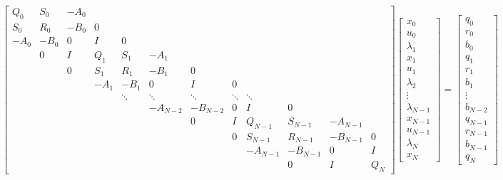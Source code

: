 \documentclass[withoutpreface,bwprint]{NoteBook}
\begin{document}
\begin{equation}
\label{eq:block_KKT_condition_sorted_by_time}
\begin{bmatrix}
Q_0 & S_0 & -A_0 &  &  & \\
S_0 & R_0 & -B_0 & 0 &  & \\
-A_0 & -B_0 & 0 & I & 0 &  \\
 & 0 & I & Q_1 & S_1 & -A_1 & \\
 &  & 0 & S_1 & R_1 & -B_1 & 0\\
 &  &  & -A_1 & -B_1 & 0 & I & 0 \\
 &  &  & 	  & \ddots &  \ddots & \ddots & \ddots & \ddots \\
 &  &  & 	  &  & -A_{N-2} & -B_{N-2} & 0 & I & 0 \\
 &  &  & 	  &  &  & 0 & I & Q_{N-1} & S_{N-1} & -A_{N-1} \\
 &  &  & 	  &  &  &  & 0 & S_{N-1} & R_{N-1} & -B_{N-1} & 0 \\
 &  &  & 	  &  &  &  & & -A_{N-1} & -B_{N-1} & 0 & I \\
&  &  & 	  &  &  &  & &  & 0 & I & Q_N 
\end{bmatrix}
\begin{bmatrix}
x_0 \\ u_0 \\ \lambda_{1} \\ x_1 \\  u_1 \\  \lambda_{2} \\ 
\vdots \\ 
\lambda_{N-1} \\ x_{N-1} \\ u_{N-1} \\ \lambda_{N}\\ x_{N}  
\end{bmatrix}
=\begin{bmatrix}
q_0\\
r_0\\
b_0 \\
q_1 \\
r_1 \\
b_1 \\
\vdots \\
b_{N-2}\\
q_{N-1} \\
r_{N-1} \\
b_{N-1} \\
q_{N} 
\end{bmatrix}
\end{equation}
\end{document}
